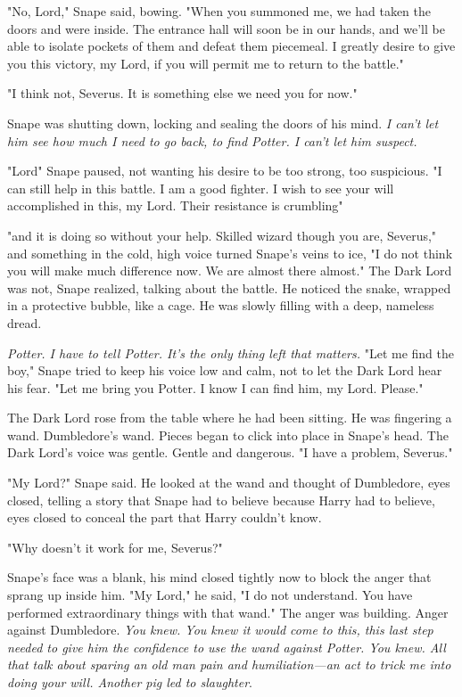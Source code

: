 "No, Lord," Snape said, bowing. "When you summoned me, we had taken the doors and were inside. The entrance hall will soon be in our hands, and we'll be able to isolate pockets of them and defeat them piecemeal. I greatly desire to give you this victory, my Lord, if you will permit me to return to the battle."

"I think not, Severus. It is something else we need you for now."

Snape was shutting down, locking and sealing the doors of his mind. \emph{I can't let him see how much I need to go back, to find Potter. I can't let him suspect.}

"Lord{\el}" Snape paused, not wanting his desire to be too strong, too suspicious. "I can still help in this battle. I am a good fighter. I wish to see your will accomplished in this, my Lord. Their resistance is crumbling{\el}"

"{\el}and it is doing so without your help. Skilled wizard though you are, Severus," and something in the cold, high voice turned Snape's veins to ice, "I do not think you will make much difference now. We are almost there{\el} almost." The Dark Lord was not, Snape realized, talking about the battle. He noticed the snake, wrapped in a protective bubble, like a cage. He was slowly filling with a deep, nameless dread.

\emph{Potter. I have to tell Potter. It's the only thing left that matters.} "Let me find the boy," Snape tried to keep his voice low and calm, not to let the Dark Lord hear his fear. "Let me bring you Potter. I know I can find him, my Lord. Please."

The Dark Lord rose from the table where he had been sitting. He was fingering a wand. Dumbledore's wand. Pieces began to click into place in Snape's head. The Dark Lord's voice was gentle. Gentle and dangerous. "I have a problem, Severus."

"My Lord?" Snape said. He looked at the wand and thought of Dumbledore, eyes closed, telling a story that Snape had to believe because Harry had to believe, eyes closed to conceal the part that Harry couldn't know.

"Why doesn't it work for me, Severus?"

Snape's face was a blank, his mind closed tightly now to block the anger that sprang up inside him. "My Lord," he said, "I do not understand. You{\el} have performed extraordinary things with that wand." The anger was building. Anger against Dumbledore. \emph{You knew. You knew it would come to this, this last step needed to give him the confidence to use the wand against Potter. You knew. All that talk about sparing an old man pain and humiliation—an act to trick me into doing your will. Another pig led to slaughter}.

